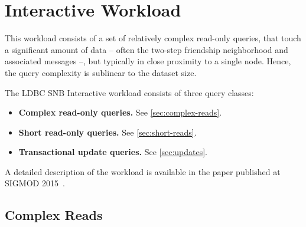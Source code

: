 \chapter{Interactive Workload}
\label{section:interactive}

This workload consists of a set of relatively complex read-only queries, that touch a significant
amount of data -- often the two-step friendship neighborhood and associated messages --, but typically in close proximity to a single node. Hence, the query complexity is sublinear to the dataset size.

The LDBC SNB Interactive workload consists of three query classes:

\begin{itemize}
\item \textbf{Complex read-only queries.} See \autoref{sec:complex-reads}.
\item \textbf{Short read-only queries.} See \autoref{sec:short-reads}.
\item \textbf{Transactional update queries.} See \autoref{sec:updates}.
\end{itemize}

A detailed description of the workload is available in the paper published at \mbox{SIGMOD} 2015~\cite{DBLP:conf/sigmod/ErlingALCGPPB15}.


\section{Complex Reads}
\label{sec:complex-reads}
















